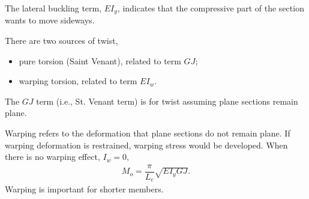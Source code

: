 The lateral buckling term, $EI_y$, indicates that the compressive part of the section wants to move sideways.

There are two sources of twist,
\begin{itemize}
\item pure torsion (Saint Venant), related to term $GJ$;
\item warping torsion, related to term $EI_w$.
\end{itemize}

The $GJ$ term (i.e., St. Venant term) is for twist assuming plane sections remain plane.
\begin{figure}[H]
\centering

\end{figure}

Warping refers to the deformation that plane sections do not remain plane. If warping deformation is restrained, warping stress would be developed. When there is no warping effect, $I_w=0$,
\begin{gather}\label{eq:no_warp}
M_o=\dfrac{\pi}{L_e}\sqrt{EI_yGJ}.
\end{gather}
Warping is important for shorter members.

